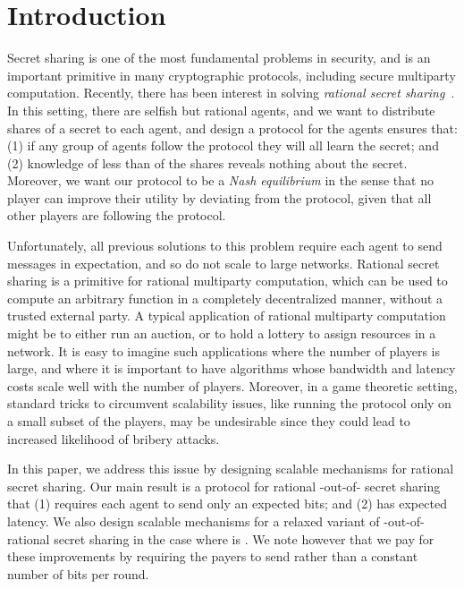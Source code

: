 \documentclass[12pt]{article}
\theoremstyle{definition}
\begin{document}
\section{Introduction}
Secret sharing is one of the most fundamental problems in security,
and is an important primitive in many cryptographic protocols,
including secure multiparty computation.  Recently, there has been
interest in solving \emph{rational secret
  sharing}~\cite{kol2008games, gordon2006rational, halpern2004rational, 
abraham2006distributed,lysyanskaya2006rationality}.
In this setting, there are  selfish but rational agents, and we
want to distribute shares of a secret to each agent, and design a
protocol for the agents ensures that: (1) if any group of  agents
follow the protocol they will all learn the secret; and (2) knowledge
of less than  of the shares reveals nothing about the secret.
Moreover, we want our protocol to be a \emph{Nash equilibrium} in the
sense that no player can improve their utility by deviating from the
protocol, given that all other players are following the protocol.

Unfortunately, all previous solutions to this problem require each
agent to send  messages in expectation, and so do not scale to
large networks.  Rational secret sharing is a primitive for rational
multiparty computation, which can be used to compute an arbitrary
function in a completely decentralized manner, without a trusted
external party.  A typical application of rational multiparty
computation might be to either run an auction, or to hold a lottery to
assign resources in a network.  It is easy to imagine such
applications where the number of players is large, and where it is
important to have algorithms whose bandwidth and latency costs scale
well with the number of players.  Moreover, in a game theoretic
setting, standard tricks to circumvent scalability issues, like
running the protocol only on a small subset of the players, may be
undesirable since they could lead to increased likelihood of bribery
attacks.

In this paper, we address this issue by designing scalable mechanisms
for rational secret sharing.  Our main result is a protocol for
rational -out-of- secret sharing that (1) requires each agent to
send only an expected  bits; and (2) has  expected
latency.  We also design scalable mechanisms for a relaxed variant of
-out-of- rational secret sharing in the case where  is
. We note however that we pay for these improvements by requiring 
the payers to send  rather than a constant number of bits per round.
\end{document}
